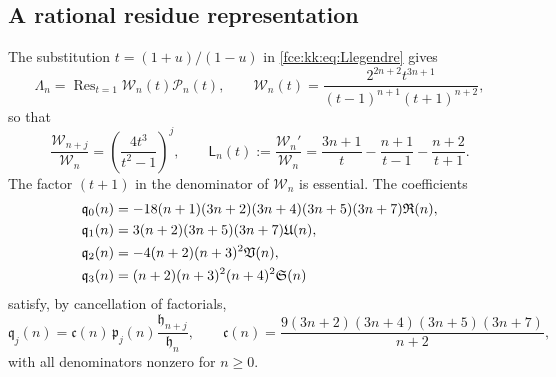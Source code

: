 \documentclass[11pt,a4paper]{article}
\numberwithin{equation}{section}
\theoremstyle{definition}\newtheorem{definition}[theorem]{Definition}
\theoremstyle{remark}\newtheorem{remark}[theorem]{Remark}
\DeclareMathOperator{\Res}{Res}
\begin{document}
\subsection{A rational residue representation}
The substitution $t=(1+u)/(1-u)$ in \eqref{fce:kk:eq:Llegendre} gives
\begin{equation}\label{fce:kk:eq:residue}
 \Lambda_n=\Res_{t=1}\mathcal W_n(t)\mathcal P_n(t),\qquad
 \mathcal W_n(t)=\frac{2^{2n+2}t^{3n+1}}{(t-1)^{n+1}(t+1)^{n+2}},
\end{equation}
so that
\begin{equation}\label{fce:kk:eq:ratioL}
 \frac{\mathcal W_{n+j}}{\mathcal W_n}=\left(\frac{4t^3}{t^2-1}\right)^j,
 \qquad \mathsf L_n(t):=\frac{\mathcal W_n'}{\mathcal W_n}=
 \frac{3n+1}{t}-\frac{n+1}{t-1}-\frac{n+2}{t+1}.
\end{equation}
The factor $(t+1)$ in the denominator of $\mathcal W_n$ is essential. The
coefficients
\begin{align}
 \mathfrak q_0(n)&=-18(n+1)(3n+2)(3n+4)(3n+5)(3n+7)\mathfrak R(n),\notag\\
 \mathfrak q_1(n)&=3(n+2)(3n+5)(3n+7)\mathfrak U(n),\notag\\
 \mathfrak q_2(n)&=-4(n+2)(n+3)^2\mathfrak V(n),\notag\\
 \mathfrak q_3(n)&=(n+2)(n+3)^2(n+4)^2\mathfrak S(n)\label{fce:kk:eq:qs}
\end{align}
satisfy, by cancellation of factorials,
\begin{equation}\label{fce:kk:eq:pqrelation}
 \mathfrak q_j(n)=\mathfrak c(n)\,\mathfrak p_j(n)\frac{\mathfrak h_{n+j}}{\mathfrak h_n},\qquad
 \mathfrak c(n)=\frac{9(3n+2)(3n+4)(3n+5)(3n+7)}{n+2},
\end{equation}
with all denominators nonzero for $n\ge0$.
\end{document}
